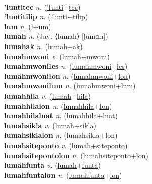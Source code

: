 \label{'luntiak} \\
\textbf{'luntitec} \textit{n.} (\hyperref['lunti]{'lunti}+\hyperref[tec]{tec})
 \label{'luntitec} \\
\textbf{'luntitilip} \textit{n.} (\hyperref['lunti]{'lunti}+\hyperref[tilip]{tilip})
 \label{'luntitilip} \\
\textbf{lum} \textit{n.} (\hyperref[l]{l}+\hyperref[um]{um})
 \label{lum} \\
\textbf{lumah} \textit{n.} (Jav. ⟨lumah⟩ [ɭumɑh])
 \label{lumah} \\
\textbf{lumahak} \textit{n.} (\hyperref[lumah]{lumah}+\hyperref[ak]{ak})
 \label{lumahak} \\
\textbf{lumahmwoni} \textit{v.} (\hyperref[lumah]{lumah}+\hyperref[mwoni]{mwoni})
 \label{lumahmwoni} \\
\textbf{lumahmwoniles} \textit{n.} (\hyperref[lumahmwoni]{lumahmwoni}+\hyperref[les]{les})
 \label{lumahmwoniles} \\
\textbf{lumahmwonilon} \textit{n.} (\hyperref[lumahmwoni]{lumahmwoni}+\hyperref[lon]{lon})
 \label{lumahmwonilon} \\
\textbf{lumahmwonilum} \textit{n.} (\hyperref[lumahmwoni]{lumahmwoni}+\hyperref[lum]{lum})
 \label{lumahmwonilum} \\
\textbf{lumahhila} \textit{v.} (\hyperref[lumah]{lumah}+\hyperref[hila]{hila})
 \label{lumahhila} \\
\textbf{lumahhilalon} \textit{n.} (\hyperref[lumahhila]{lumahhila}+\hyperref[lon]{lon})
 \label{lumahhilalon} \\
\textbf{lumahhilaluat} \textit{n.} (\hyperref[lumahhila]{lumahhila}+\hyperref[luat]{luat})
 \label{lumahhilaluat} \\
\textbf{lumahsikla} \textit{v.} (\hyperref[lumah]{lumah}+\hyperref[sikla]{sikla})
 \label{lumahsikla} \\
\textbf{lumahsiklalon} \textit{n.} (\hyperref[lumahsikla]{lumahsikla}+\hyperref[lon]{lon})
 \label{lumahsiklalon} \\
\textbf{lumahsiteponto} \textit{v.} (\hyperref[lumah]{lumah}+\hyperref[siteponto]{siteponto})
 \label{lumahsiteponto} \\
\textbf{lumahsitepontolon} \textit{n.} (\hyperref[lumahsiteponto]{lumahsiteponto}+\hyperref[lon]{lon})
 \label{lumahsitepontolon} \\
\textbf{lumahfunta} \textit{v.} (\hyperref[lumah]{lumah}+\hyperref[funta]{funta})
 \label{lumahfunta} \\
\textbf{lumahfuntalon} \textit{n.} (\hyperref[lumahfunta]{lumahfunta}+\hyperref[lon]{lon})
